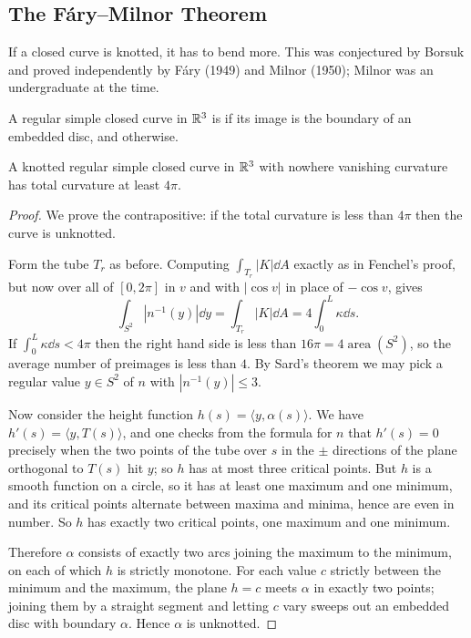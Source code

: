 \documentclass[a4paper]{scrartcl}
\begin{document}
\subsection{The F\'ary--Milnor Theorem}

If a closed curve is knotted, it has to bend more. This was conjectured by Borsuk and proved independently by F\'ary (1949) and Milnor (1950); Milnor was an undergraduate at the time.

\begin{definition}[Unknotted]
    A regular simple closed curve in $\mathbb{R}^3$ is  if its image is the boundary of an embedded disc, and  otherwise.
\end{definition}

\begin{theorem}
    A knotted regular simple closed curve in $\mathbb{R}^3$ with nowhere vanishing curvature has total curvature at least $4\pi$.
\end{theorem}
\begin{proof}
    We prove the contrapositive: if the total curvature is less than $4\pi$ then the curve is unknotted.

    Form the tube $T_r$ as before. Computing $\int_{T_r}|K|\dd A$ exactly as in Fenchel's proof, but now over all of $[0,2\pi]$ in $v$ and with $|\cos v|$ in place of $-\cos v$, gives
    $$
    \int_{S^2}\left|n^{-1}(y)\right|\dd y = \int_{T_r}|K|\dd A = 4\int_0^L\kappa\dd s.
    $$
    If $\int_0^L\kappa \dd s < 4\pi$ then the right hand side is less than $16\pi = 4\operatorname{area}(S^2)$, so the average number of preimages is less than $4$. By Sard's theorem we may pick a regular value $y \in S^2$ of $n$ with $\left|n^{-1}(y)\right| \leq 3$.

    Now consider the height function $h(s) = \langle y, \alpha(s)\rangle$. We have $h'(s) = \langle y, T(s)\rangle$, and one checks from the formula for $n$ that $h'(s) = 0$ precisely when the two points of the tube over $s$ in the $\pm$ directions of the plane orthogonal to $T(s)$ hit $y$; so $h$ has at most three critical points. But $h$ is a smooth function on a circle, so it has at least one maximum and one minimum, and its critical points alternate between maxima and minima, hence are even in number. So $h$ has exactly two critical points, one maximum and one minimum.

    Therefore $\alpha$ consists of exactly two arcs joining the maximum to the minimum, on each of which $h$ is strictly monotone. For each value $c$ strictly between the minimum and the maximum, the plane $h = c$ meets $\alpha$ in exactly two points; joining them by a straight segment and letting $c$ vary sweeps out an embedded disc with boundary $\alpha$. Hence $\alpha$ is unknotted.
\end{proof}
\end{document}
